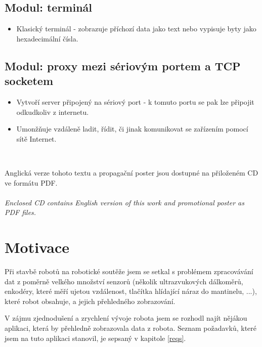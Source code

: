 \documentclass[12pt, a4paper, oneside]{article}
\newcommand{\It}{\textit}  %
\begin{document}
\subsection*{Modul: terminál}
\begin{itemize}
    \item Klasický terminál - zobrazuje příchozí data jako text nebo vypisuje byty jako hexadecimální čísla.
\end{itemize}

\subsection*{Modul: proxy mezi sériovým portem a TCP socketem}
\begin{itemize}
    \item Vytvoří server připojený na sériový port - k tomuto portu se pak lze připojit odkudkoliv z internetu.
    \item Umonžňuje vzdáleně ladit, řídit, či jinak komunikovat se zařízením pomocí sítě Internet.
\end{itemize}
~
\vspace{7mm}

\noindent Anglická verze tohoto textu a propagační poster jsou dostupné na přiloženém CD ve formátu PDF.\\
\\
\noindent\It{Enclosed CD contains English version of this work and promotional poster as PDF files.}

\section{Motivace}
\label{motivace}
Při stavbě robotů na robotické soutěže jsem se setkal s problémem zpracovávání dat z poměrně velkého množství senzorů (několik ultrazvukových dálkoměrů, enkodéry, které měří ujetou vzdálenost, tlačítka hlídající náraz do mantinelu, ...), které robot obsahuje, a jejich přehledného zobrazování. 

V zájmu zjednodušení a zrychlení vývoje robota jsem se rozhodl najít nějákou aplikaci, která by přehledně zobrazovala data z robota. Seznam požadavků, které jsem na tuto aplikaci stanovil, je sepsaný v kapitole \ref{reqs}.
\end{document}

